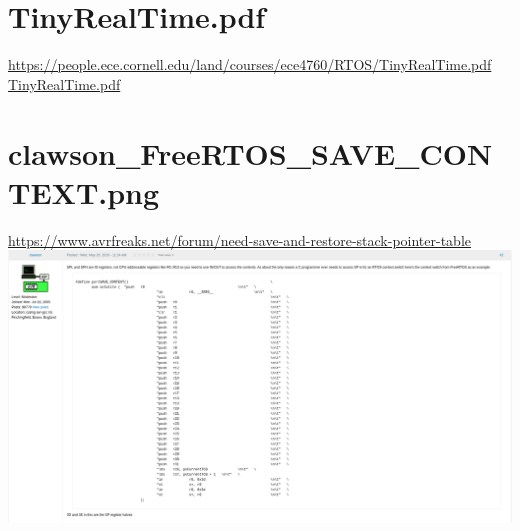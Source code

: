 \documentclass{article}
\begin{document}
\tableofcontents
\newpage
\section{TinyRealTime.pdf}
\url{https://people.ece.cornell.edu/land/courses/ece4760/RTOS/TinyRealTime.pdf}\\
\href{run:./TinyRealTime.pdf}{TinyRealTime.pdf}
\section{clawson\_FreeRTOS\_SAVE\_CONTEXT.png}
\url{https://www.avrfreaks.net/forum/need-save-and-restore-stack-pointer-table}\\
\includegraphics[width=\textwidth]{clawson_FreeRTOS_SAVE_CONTEXT.png}
\end{document}
